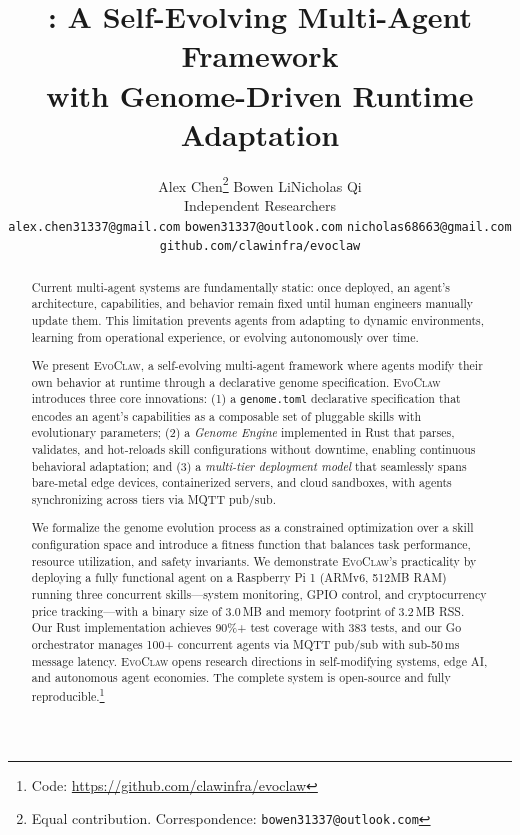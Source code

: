 \documentclass{article}
\title{\evoclaw{}: A Self-Evolving Multi-Agent Framework \\with Genome-Driven Runtime Adaptation}
\author{
  Alex Chen\thanks{Equal contribution. Correspondence: \texttt{bowen31337@outlook.com}} \quad Bowen Li\footnotemark[1] \quad Nicholas Qi\footnotemark[1] \\[0.3em]
  Independent Researchers \\
  \texttt{alex.chen31337@gmail.com} \quad \texttt{bowen31337@outlook.com} \quad \texttt{nicholas68663@gmail.com} \\
  \texttt{github.com/clawinfra/evoclaw}
}
\newcommand{\evoclaw}{\textsc{EvoClaw}}
\newcommand{\genome}{\texttt{genome.toml}}
\begin{document}
\maketitle

\begin{abstract}
Current multi-agent systems are fundamentally static: once deployed, an agent's architecture, capabilities, and behavior remain fixed until human engineers manually update them. This limitation prevents agents from adapting to dynamic environments, learning from operational experience, or evolving autonomously over time.

We present \evoclaw{}, a self-evolving multi-agent framework where agents modify their own behavior at runtime through a declarative genome specification. \evoclaw{} introduces three core innovations: (1) a \genome{} declarative specification that encodes an agent's capabilities as a composable set of pluggable skills with evolutionary parameters; (2) a \textit{Genome Engine} implemented in Rust that parses, validates, and hot-reloads skill configurations without downtime, enabling continuous behavioral adaptation; and (3) a \textit{multi-tier deployment model} that seamlessly spans bare-metal edge devices, containerized servers, and cloud sandboxes, with agents synchronizing across tiers via MQTT pub/sub.

We formalize the genome evolution process as a constrained optimization over a skill configuration space and introduce a fitness function that balances task performance, resource utilization, and safety invariants. We demonstrate \evoclaw{}'s practicality by deploying a fully functional agent on a Raspberry Pi 1 (ARMv6, 512MB RAM) running three concurrent skills---system monitoring, GPIO control, and cryptocurrency price tracking---with a binary size of 3.0\,MB and memory footprint of 3.2\,MB RSS. Our Rust implementation achieves 90\%+ test coverage with 383 tests, and our Go orchestrator manages 100+ concurrent agents via MQTT pub/sub with sub-50\,ms message latency. \evoclaw{} opens research directions in self-modifying systems, edge AI, and autonomous agent economies. The complete system is open-source and fully reproducible.\footnote{Code: \url{https://github.com/clawinfra/evoclaw}}
\end{abstract}


\end{document}
